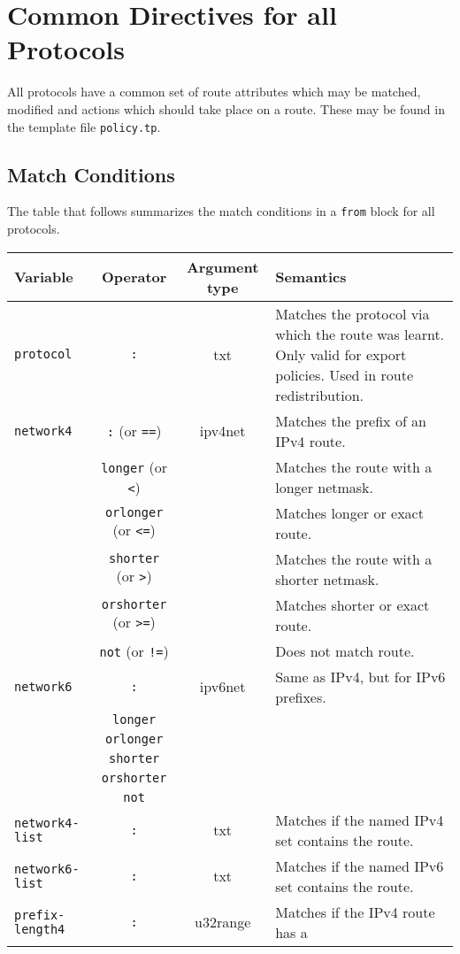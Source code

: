 \section{Common Directives for all Protocols}
All protocols have a common set of route attributes which may be matched,
modified and actions which should take place on a route.  These may be found in
the template file {\tt policy.tp}. 

\subsection{Match Conditions}
The table that follows summarizes the match conditions in a {\tt from} block for
all protocols.
\begin{center}
\begin{tabular}{|l|c|c|p{5.5cm}|}
\hline
Variable & Operator & Argument type & Semantics \\
\hline\hline
{\tt protocol} & {\tt :} & txt & Matches the protocol via which the route was
learnt.  Only valid for export policies.  Used in route redistribution. \\
\hline
{\tt network4} & {\tt :} (or {\tt ==}) & ipv4net & Matches the prefix of an IPv4
route. \\
& {\tt longer} (or {\tt <}) & & Matches the route with a longer netmask. \\
& {\tt orlonger} (or {\tt <=}) & & Matches longer or exact route. \\
& {\tt shorter} (or {\tt >})& & Matches the route with a shorter netmask. \\
& {\tt orshorter} (or {\tt >=}) & & Matches shorter or exact route. \\
& {\tt not} (or {\tt !=}) & & Does not match route. \\
\hline
{\tt network6} & {\tt :} & ipv6net & Same as IPv4, but for IPv6 prefixes. \\
& {\tt longer} & & \\
& {\tt orlonger} & & \\
& {\tt shorter} & & \\
& {\tt orshorter} & & \\
& {\tt not} & & \\
\hline
{\tt network4-list} & {\tt :} & txt & Matches if the named IPv4 set
contains the route.\\
\hline
{\tt network6-list} & {\tt :} & txt & Matches if the named IPv6 set
contains the route.\\
\hline
{\tt prefix-length4} & {\tt :} & u32range & Matches if the IPv4 route has a

\end{tabular}
\end{center}
